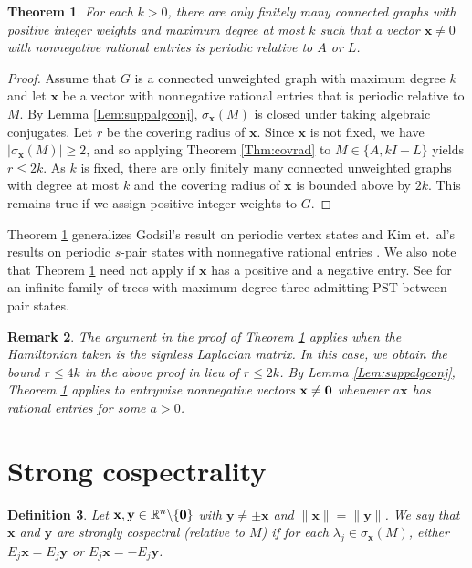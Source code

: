 \documentclass[11pt]{article}
\newtheorem{theorem}{Theorem}
\newtheorem{definition}[theorem]{Definition}
\newtheorem{remark}[theorem]{Remark}
\newcommand{\zero}{{\bf{0}}}
\newcommand{\bx}{\mathbf x}
\newcommand{\by}{\mathbf y}
\def\R{\mathbb{R}}
\begin{document}
\begin{theorem}
\label{Thm:rare}
For each $k>0$, there are only finitely many connected graphs with positive integer weights and maximum degree at most $k$ such that a vector $\bx\neq 0$ with nonnegative rational entries is periodic relative to $A$ or $L$.
\end{theorem}

\begin{proof}
Assume that $G$ is a connected unweighted graph with maximum degree $k$ and let $\bx$ be a vector with nonnegative rational entries that is periodic relative to $M$. By Lemma \ref{Lem:suppalgconj}, $\sigma_{\bx}(M)$ is closed under taking algebraic conjugates. Let $r$ be the covering radius of $\bx$. Since $\bx$ is not fixed, we have $|\sigma_{\bx}(M)|\geq 2$, and so applying Theorem \ref{Thm:covrad} to $M\in\{A, kI-L\}$ yields $r\leq 2k$. As $k$ is fixed, there are only finitely many connected unweighted graphs with degree at most $k$ and the covering radius of $\bx$ is bounded above by $2k$. This remains true if we assign positive integer weights to $G$.
\end{proof}

Theorem \ref{Thm:rare} generalizes Godsil's result on periodic vertex states \cite[Corollary 6.2]{godsil2010can} and Kim et.\ al's results on periodic $s$-pair states with nonnegative rational entries \cite[Corollary 3.5]{kim2024generalization}. We also note that Theorem \ref{Thm:rare} need not apply if $\bx$ has a positive and a negative entry. See \cite{pal2024quantum} for an infinite family of trees with maximum degree three admitting PST between pair states. 

\begin{remark}
The argument in the proof of Theorem \ref{Thm:rare} applies when the Hamiltonian taken is the signless Laplacian matrix. In this case, we obtain the bound $r\leq 4k$ in the above proof in lieu of $r\leq 2k$. By Lemma \ref{Lem:suppalgconj}, Theorem \ref{Thm:rare} applies to entrywise nonnegative vectors $\bx\neq \zero$ whenever $a\bx$ has rational entries for some $a>0$.
\end{remark}

\section{Strong cospectrality}
\label{Sec:sc}

\begin{definition}
\label{scdef}
Let $\bx,\by\in \R^n\backslash\{\zero\}$ with $\by\neq\pm \bx$ and $\|\bx\|=\|\by\|$. We say that $\bx$ and $\by$ are \textit{strongly cospectral} (relative to $M$) if for each $\lambda_j \in \sigma_{\bx}(M)$, either  
$E_j\bx= E_j\by$ or $E_j\bx= -E_j\by$.
\end{definition}
\end{document}
